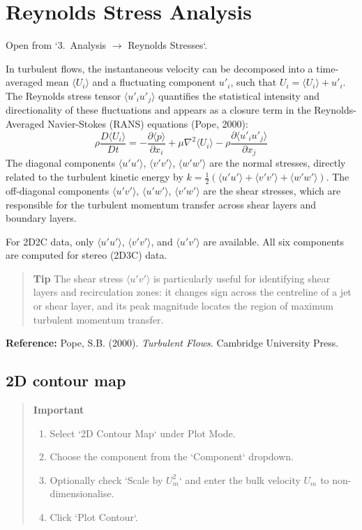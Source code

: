 \section{Reynolds Stress Analysis}
\label{ch:reynolds}

Open from `3.\ Analysis $\to$ Reynolds Stresses`.

In turbulent flows, the instantaneous velocity can be decomposed into a time-averaged mean $\langle U_i \rangle$ and a fluctuating component $u'_i$, such that $U_i = \langle U_i \rangle + u'_i$. The Reynolds stress tensor $\langle u'_i u'_j \rangle$ quantifies the statistical intensity and directionality of these fluctuations and appears as a closure term in the Reynolds-Averaged Navier-Stokes (RANS) equations (Pope, 2000):
\[
\rho \frac{D \langle U_i \rangle}{Dt} = -\frac{\partial \langle p \rangle}{\partial x_i} + \mu \nabla^2 \langle U_i \rangle - \rho \frac{\partial \langle u'_i u'_j \rangle}{\partial x_j}
\]
The diagonal components $\langle u'u' \rangle$, $\langle v'v' \rangle$, $\langle w'w' \rangle$ are the normal stresses, directly related to the turbulent kinetic energy by $k = \tfrac{1}{2}(\langle u'u'\rangle + \langle v'v'\rangle + \langle w'w'\rangle)$. The off-diagonal components $\langle u'v' \rangle$, $\langle u'w' \rangle$, $\langle v'w' \rangle$ are the shear stresses, which are responsible for the turbulent momentum transfer across shear layers and boundary layers.

For 2D2C data, only $\langle u'u' \rangle$, $\langle v'v' \rangle$, and $\langle u'v' \rangle$ are available. All six components are computed for stereo (2D3C) data.

\begin{quote}
\textbf{Tip}
The shear stress $\langle u'v' \rangle$ is particularly useful for identifying shear layers and recirculation zones: it changes sign across the centreline of a jet or shear layer, and its peak magnitude locates the region of maximum turbulent momentum transfer.
\end{quote}

\noindent\textbf{Reference:} Pope, S.B. (2000). \textit{Turbulent Flows}. Cambridge University Press.

\subsection{2D contour map}

\begin{quote}
\textbf{Important}
\begin{enumerate}[leftmargin=1.5em, topsep=2pt]
  \item Select `2D Contour Map` under Plot Mode.
  \item Choose the component from the `Component` dropdown.
  \item Optionally check `Scale by $U_m^2$` and enter the bulk velocity $U_m$ to non-dimensionalise.
  \item Click `Plot Contour`.
\end{enumerate}
\end{quote}

